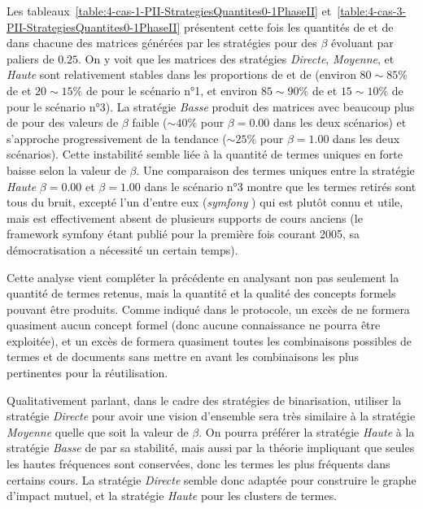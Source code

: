 Les tableaux~\ref{table:4-cas-1-PII-StrategiesQuantites0-1PhaseII} et~\ref{table:4-cas-3-PII-StrategiesQuantites0-1PhaseII} présentent cette fois les quantités de  \fg et de  \fg dans chacune des matrices générées par les stratégies pour des $ \beta $ évoluant par paliers de $ 0.25 $.
On y voit que les matrices des stratégies \textit{Directe}, \textit{Moyenne}, et \textit{Haute} sont relativement stables dans les proportions de  \fg et de  \fg (environ $ 80 \sim 85 \% $ de  \fg et $ 20 \sim 15 \% $ de  \fg pour le scénario n°1, et environ $ 85 \sim 90 \% $ de  \fg et $ 15 \sim 10 \% $ de  \fg pour le scénario n°3).
La stratégie \textit{Basse} produit des matrices avec beaucoup plus de  \fg pour des valeurs de $ \beta $ faible ($ \sim 40 \% $ pour $ \beta = 0.00 $ dans les deux scénarios) et s'approche progressivement de la tendance ($ \sim 25 \% $ pour $ \beta = 1.00 $ dans les deux scénarios).
Cette instabilité semble liée à la quantité de termes uniques en forte baisse selon la valeur de $ \beta $.
Une comparaison des termes uniques entre la stratégie \textit{Haute} $ \beta = 0.00 $ et $ \beta = 1.00 $ dans le scénario n°3 montre que les termes retirés sont tous du bruit, excepté l'un d'entre eux (\og \textit{symfony} \fg) qui est plutôt connu et utile, mais est effectivement absent de plusieurs supports de cours anciens (le framework symfony étant publié pour la première fois courant 2005, sa démocratisation a nécessité un certain temps).

\bigskip

Cette analyse vient compléter la précédente en analysant non pas seulement la quantité de termes retenus, mais la quantité et la qualité des concepts formels pouvant être produits.
Comme indiqué dans le protocole, un excès de  \fg ne formera quasiment aucun concept formel (donc aucune connaissance ne pourra être exploitée), et un excès de  \fg formera quasiment toutes les combinaisons possibles de termes et de documents sans mettre en avant les combinaisons les plus pertinentes pour la réutilisation.

\bigskip

Qualitativement parlant, dans le cadre des stratégies de binarisation, utiliser la stratégie \textit{Directe} pour avoir une vision d'ensemble sera très similaire à la stratégie \textit{Moyenne} quelle que soit la valeur de $ \beta $.
On pourra préférer la stratégie \textit{Haute} à la stratégie \textit{Basse} de par sa stabilité, mais aussi par la théorie impliquant que seules les hautes fréquences sont conservées, donc les termes les plus fréquents dans certains cours.
La stratégie \textit{Directe} semble donc adaptée pour construire le graphe d'impact mutuel, et la stratégie \textit{Haute} pour les clusters de termes.





